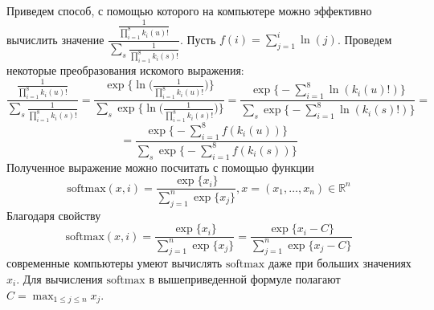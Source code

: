\documentclass[a4paper,14pt]{extarticle}
\theoremstyle{definition}
\begin{document}
Приведем способ, с помощью которого на компьютере можно эффективно вычислить значение $\dfrac{\frac{1}{\prod_{i=1}^8 k_i(u)!}}
{\sum_{s} \frac{1}{\prod_{i=1}^8 k_i(s)!}}$. Пусть $f(i)=\sum_{j=1}^{i} \ln(j)$. Проведем некоторые преобразования искомого выражения:
$$
\dfrac{\frac{1}{\prod_{i=1}^8 k_i(u)!}}{\sum_{s} \frac{1}{\prod_{i=1}^8 k_i(s)!}}=
\dfrac{\exp \biggl\{ \ln \biggl( \frac{1}{\prod_{i=1}^8 k_i(u)!} \biggr) \biggr\}}
{\sum_{s} \exp \biggl\{ \ln \biggl( \frac{1}{\prod_{i=1}^8 k_i(s)!} \biggr) \biggr\}}
= \dfrac{\exp \biggl\{ -\sum_{i=1}^8 \ln(k_i(u)!) \biggr\}}{\sum_{s} \exp \biggl\{ -\sum_{i=1}^8 \ln(k_i(s)!) \biggr\}} =
$$
$$
= \dfrac{\exp \biggl\{ -\sum_{i=1}^8 f(k_i(u)) \biggr\}}{\sum_{s} \exp \biggl\{ -\sum_{i=1}^8 f(k_i(s)) \biggr\}}
$$
Полученное выражение можно посчитать с помощью функции
$$
\text{softmax}(x,i)=\dfrac{\exp\{x_i\}}{\sum_{j=1}^{n} \exp\{x_j\}}, x=(x_1,\ldots,x_n) \in \mathbb{R}^n
$$
Благодаря свойству
$$
\text{softmax}(x,i)=\dfrac{\exp\{x_i\}}{\sum_{j=1}^{n} \exp\{x_j\}} = \dfrac{\exp\{x_i - C\}}{\sum_{j=1}^{n} \exp\{x_j - C\}}
$$
современные компьютеры умеют вычислять $\text{softmax}$ даже при больших значениях $x_i$.
Для вычисления $\text{softmax}$ в вышеприведенной формуле полагают $C=\max_{1\leq j \leq n} x_j$.
\end{document}
